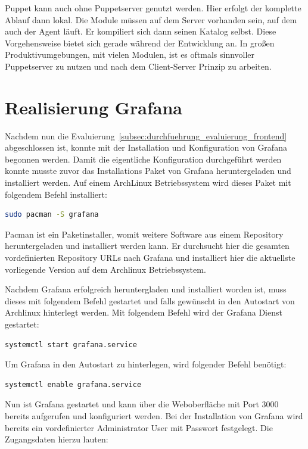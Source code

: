Puppet kann auch ohne Puppetserver genutzt werden. Hier erfolgt der komplette
Ablauf dann lokal. Die Module müssen auf dem Server vorhanden sein, auf dem
auch der Agent läuft. Er kompiliert sich dann seinen Katalog selbst. Diese
Vorgehensweise bietet sich gerade während der Entwicklung an. In großen
Produktivumgebungen, mit vielen Modulen, ist es oftmals sinnvoller Puppetserver
zu nutzen und nach dem Client-Server Prinzip zu arbeiten.
\tm%

\section{Realisierung Grafana}
\label{sec:realisierung_Grafana} Nachdem nun die
Evaluierung~\ref{subsec:durchfuehrung_evaluierung_frontend} abgeschlossen ist,
konnte mit der Installation und Konfiguration von Grafana begonnen werden.
Damit die eigentliche Konfiguration durchgeführt werden konnte musste zuvor das
Installations Paket von Grafana heruntergeladen und installiert werden. Auf
einem ArchLinux Betriebssystem wird dieses Paket mit folgendem Befehl
installiert:

\begin{lstlisting}[language=bash]
sudo pacman -S grafana
\end{lstlisting}

Pacman ist ein Paketinstaller, womit weitere Software aus einem Repository
heruntergeladen und installiert werden kann. Er durchsucht hier die gesamten
vordefinierten Repository URLs nach Grafana und installiert hier die aktuellste
vorliegende Version auf dem Archlinux Betriebssystem.

Nachdem Grafana erfolgreich heruntergladen und installiert worden ist, muss
dieses mit folgendem Befehl gestartet und falls gewünscht in den Autostart von
Archlinux hinterlegt werden. Mit folgendem Befehl wird der Grafana Dienst
gestartet:
\begin{lstlisting}[language=bash]
systemctl start grafana.service
\end{lstlisting}

Um Grafana in den Autostart zu hinterlegen, wird folgender Befehl benötigt:
\begin{lstlisting}[language=bash]
systemctl enable grafana.service
\end{lstlisting}

Nun ist Grafana gestartet und kann über die Weboberfläche mit Port 3000
bereits aufgerufen und konfiguriert werden. Bei der Installation von Grafana
wird bereits ein vordefinierter Administrator User mit Passwort festgelegt. Die
Zugangsdaten hierzu lauten:

